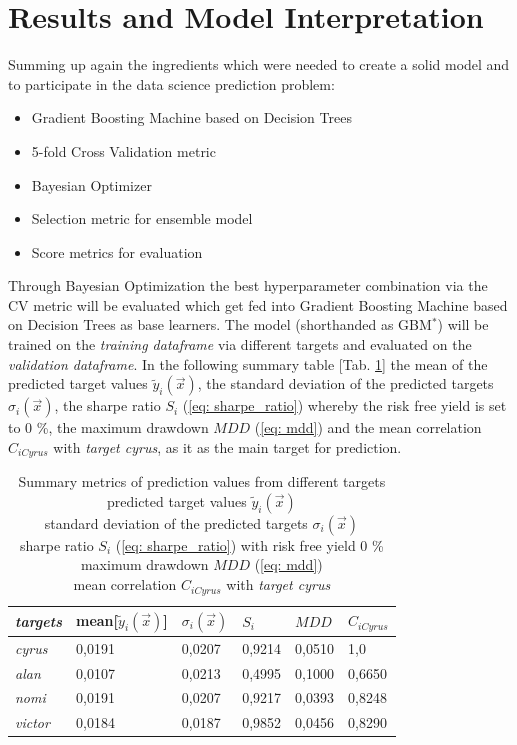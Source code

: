 \documentclass[12pt, a4paper]{article}
\begin{document}
\section{Results and Model Interpretation}
Summing up again the ingredients which were needed to create a solid model and to participate in the data science prediction problem:
\begin{itemize}
    \item Gradient Boosting Machine based on Decision Trees
    \item 5-fold Cross Validation metric
    \item Bayesian Optimizer
    \item Selection metric for ensemble model
    \item Score metrics for evaluation
\end{itemize}
Through Bayesian Optimization the best hyperparameter combination via the CV metric will be evaluated which get fed into Gradient Boosting Machine based on Decision Trees as base learners. The model (shorthanded as GBM$^{\ast}$) will be trained on the \textit{training dataframe} via different targets and evaluated on the \textit{validation dataframe}. In the following summary table [Tab. \ref{table: summary_metric_predictions}] the mean of the predicted target values $\tilde{y}_i(\vec{x})$, the standard deviation of the predicted targets $\sigma_i(\vec{x})$, the sharpe ratio $S_i$ (\ref{eq: sharpe_ratio}) whereby the risk free yield is set to 0 \%, the maximum drawdown $MDD$ (\ref{eq: mdd}) and the mean correlation $C_{iCyrus}$ with \textit{target cyrus}, as it as the main target for prediction. 
\begin{table}[!htbp]
\centering
\caption{Summary metrics of prediction values from different targets \\
predicted target values $\tilde{y}_i(\vec{x})$ \\
standard deviation of the predicted targets $\sigma_i(\vec{x})$ \\
sharpe ratio $S_i$ (\ref{eq: sharpe_ratio}) with risk free yield 0 \% \\
maximum drawdown $MDD$ (\ref{eq: mdd}) \\
mean correlation $C_{iCyrus}$ with \textit{target cyrus} \\}
\label{table: summary_metric_predictions}
\begin{tabular}{|l|l|l|l|l|l|}
\hline
\textit{targets} & mean[$\tilde{y}_i(\vec{x})$] & $\sigma_i(\vec{x})$ & $S_i$ & $MDD$ & $C_{iCyrus}$ \\ \hline
\hline
\hline
\textit{cyrus} & 0,0191 & 0,0207 & 0,9214 & 0,0510 & 1,0  \\ \hline
\textit{alan} & 0,0107 & 0,0213 & 0,4995 & 0,1000 & 0,6650 \\ \hline
\textit{nomi} & 0,0191 & 0,0207 & 0,9217 & 0,0393 & 0,8248 \\ \hline
\textit{victor} & 0,0184 & 0,0187 & 0,9852 & 0,0456 &  0,8290 \\ \hline
\end{tabular}
\end{table}
\end{document}
